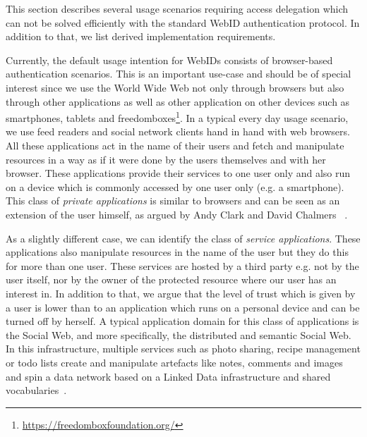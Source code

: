 \documentclass[a4paper]{llncs}
\begin{document}
This section describes several usage scenarios requiring access delegation which can not be solved efficiently with the standard WebID authentication protocol.
In addition to that, we list derived implementation requirements.



Currently, the default usage intention for WebIDs consists of browser-based authentication scenarios.
This is an important use-case and should be of special interest since we use the World Wide Web not only through browsers but also through other applications as well as other application on other devices such as smartphones, tablets and freedomboxes\footnote{\url{https://freedomboxfoundation.org/}}.
In a typical every day usage scenario, we use feed readers and social network clients hand in hand with web browsers.
All these applications act in the name of their users and fetch and manipulate resources in a way as if it were done by the users themselves and with her browser.
These applications provide their services to one user only and also run on a device which is commonly accessed by one user only (e.g. a smartphone).
This class of \textit{private applications} is similar to browsers and can be seen as an extension of the user himself, as argued by Andy Clark and David Chalmers ~\cite{clark-a-1998-7-a}.

As a slightly different case, we can identify the class of \textit{service applications}.
These applications also manipulate resources in the name of the user but they do this for more than one user.
These services are hosted by a third party e.g. not by the user itself, nor by the owner of the protected resource where our user has an interest in.
In addition to that, we argue that the level of trust which is given by a user is lower than to an application which runs on a personal device and can be turned off by herself.
A typical application domain for this class of applications is the Social Web, and more specifically, the distributed and semantic Social Web.
In this infrastructure, multiple services such as photo sharing, recipe management or todo lists create and manipulate artefacts like notes, comments and images and spin a data network based on a Linked Data infrastructure and shared vocabularies~\cite{tramp-s-2012--a}.
\end{document}
